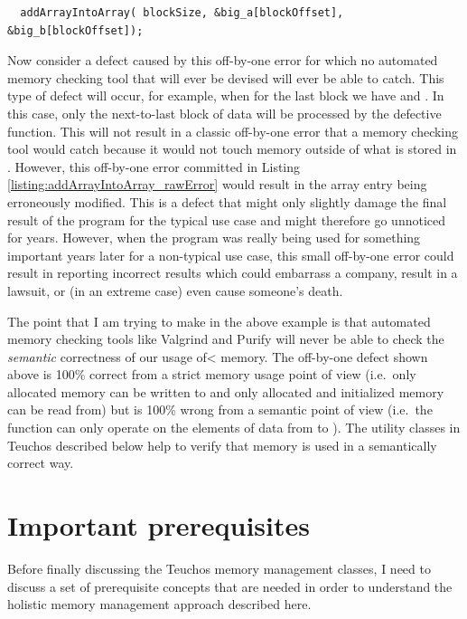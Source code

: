 \documentclass[pdf,ps2pdf,11pt]{SANDreport}
\begin{document}
{\small\begin{verbatim}
  addArrayIntoArray( blockSize, &big_a[blockOffset], &big_b[blockOffset]);
\end{verbatim}}

Now consider a defect caused by this off-by-one error for which no
automated memory checking tool that will ever be devised will ever be
able to catch.  This type of defect will occur, for example, when for
the last block {} we have
{} and
{}.  In this case, only
the next-to-last block of data will be processed by the defective
{} function.  This will not result in a
classic off-by-one error that a memory checking tool would catch
because it would not touch memory outside of what is stored in
{}.  However, this off-by-one error committed in Listing
{}\ref{listing:addArrayIntoArray_rawError} would result in the array
entry {} being
erroneously modified.  This is a defect that might only slightly
damage the final result of the program for the typical use case and
might therefore go unnoticed for years.  However, when the program was
really being used for something important years later for a
non-typical use case, this small off-by-one error could result in
reporting incorrect results which could embarrass a company, result in
a lawsuit, or (in an extreme case) even cause someone's death.

The point that I am trying to make in the above example is that
automated memory checking tools like Valgrind and Purify will never be
able to check the {}\textit{semantic} correctness of our usage of<
memory.  The off-by-one defect shown above is 100\% correct from a
strict memory usage point of view (i.e.\ only allocated memory can be
written to and only allocated and initialized memory can be read from)
but is 100\% wrong from a semantic point of view (i.e.\ the function
{} can only operate on the elements of
data from {} to {}).  The utility classes in
Teuchos described below help to verify that memory is used in a
semantically correct way.


%
{}\section{Important prerequisites}
\label{sec:important-prerequisites}
%

Before finally discussing the Teuchos memory management classes, I
need to discuss a set of prerequisite concepts that are needed in
order to understand the holistic memory management approach described
here.
\end{document}
